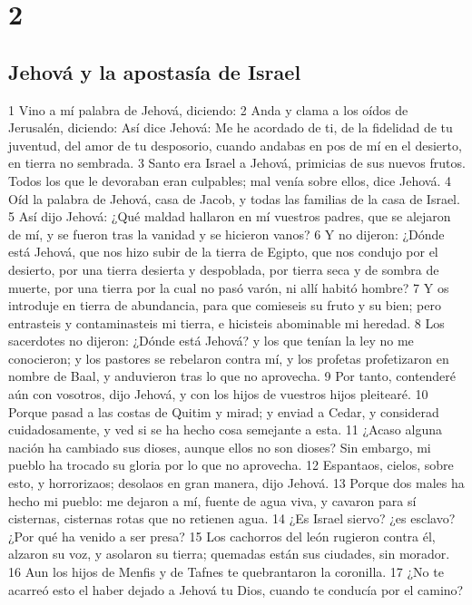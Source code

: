 \chapter{2}

\section*{Jehová y la apostasía de Israel}

1 Vino a mí palabra de Jehová, diciendo:
2 Anda y clama a los oídos de Jerusalén, diciendo: Así dice Jehová: Me he acordado de ti, de la fidelidad de tu juventud, del amor de tu desposorio, cuando andabas en pos de mí en el desierto, en tierra no sembrada.
3 Santo era Israel a Jehová, primicias de sus nuevos frutos. Todos los que le devoraban eran culpables; mal venía sobre ellos, dice Jehová.
4 Oíd la palabra de Jehová, casa de Jacob, y todas las familias de la casa de Israel.
5 Así dijo Jehová: ¿Qué maldad hallaron en mí vuestros padres, que se alejaron de mí, y se fueron tras la vanidad y se hicieron vanos?
6 Y no dijeron: ¿Dónde está Jehová, que nos hizo subir de la tierra de Egipto, que nos condujo por el desierto, por una tierra desierta y despoblada, por tierra seca y de sombra de muerte, por una tierra por la cual no pasó varón, ni allí habitó hombre?
7 Y os introduje en tierra de abundancia, para que comieseis su fruto y su bien; pero entrasteis y contaminasteis mi tierra, e hicisteis abominable mi heredad.
8 Los sacerdotes no dijeron: ¿Dónde está Jehová? y los que tenían la ley no me conocieron; y los pastores se rebelaron contra mí, y los profetas profetizaron en nombre de Baal, y anduvieron tras lo que no aprovecha.
9 Por tanto, contenderé aún con vosotros, dijo Jehová, y con los hijos de vuestros hijos pleitearé.
10 Porque pasad a las costas de Quitim y mirad; y enviad a Cedar, y considerad cuidadosamente, y ved si se ha hecho cosa semejante a esta.
11 ¿Acaso alguna nación ha cambiado sus dioses, aunque ellos no son dioses? Sin embargo, mi pueblo ha trocado su gloria por lo que no aprovecha.
12 Espantaos, cielos, sobre esto, y horrorizaos; desolaos en gran manera, dijo Jehová.
13 Porque dos males ha hecho mi pueblo: me dejaron a mí, fuente de agua viva, y cavaron para sí cisternas, cisternas rotas que no retienen agua.
14 ¿Es Israel siervo? ¿es esclavo? ¿Por qué ha venido a ser presa?
15 Los cachorros del león rugieron contra él, alzaron su voz, y asolaron su tierra; quemadas están sus ciudades, sin morador.
16 Aun los hijos de Menfis y de Tafnes te quebrantaron la coronilla.
17 ¿No te acarreó esto el haber dejado a Jehová tu Dios, cuando te conducía por el camino?
